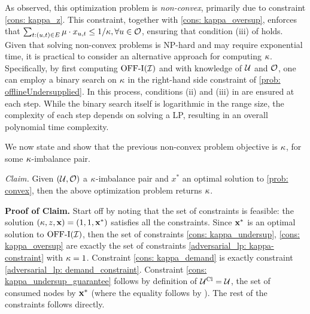 {As observed, this optimization problem is \textit{non-convex}, primarily due to constraint \eqref{cons: kappa_z}. This constraint, together with \eqref{cons: kappa_oversup}, enforces that $\sum_{t : (u,t) \in E} \mu \cdot x_{u,t} \leq 1/\kappa, \forall u \in \mathcal O$, ensuring that condition (iii) of  holds. Given that solving non-convex problems is NP-hard and may require exponential time, it is practical to consider an alternative approach for computing $\kappa$. Specifically, by first computing $\mathrm{\mathrm{OFF}}\textrm{-}\mathrm{I}(\mathcal I)$ and with knowledge of $\mathcal U$ and $\mathcal O$, one can employ a binary search on $\kappa$ in the right-hand side constraint of \ref{prob: offlineUndersupplied}. In this process, conditions (ii) and (iii) in  are ensured at each step. While the binary search itself is logarithmic in the range size, the complexity of each step depends on solving a LP, resulting in an overall polynomial time complexity.

We now state and show that the previous non-convex problem objective is $\kappa$, for some $\kappa$-imbalance pair.


\noindent\textit{Claim.}
    Given $(\mathcal U, \mathcal O)$ a $\kappa$-imbalance pair and $x^*$ an optimal solution to \ref{prob: convex}, then the above optimization problem returns $\kappa$.

\noindent \textbf{Proof of Claim.} Start off by noting that the set of constraints is feasible: the solution $(\kappa, z, \mathbf{x}) = (1,1,\mathbf{x}^*)$ satisfies all the constraints. Since $\mathbf{x}^*$ is an optimal solution to $\mathrm{\mathrm{OFF}}\textrm{-}\mathrm{I}(\mathcal I)$, then the set of constraints \eqref{cons: kappa_undersup}, \eqref{cons: kappa_oversup} are exactly the set of constraints \eqref{adversarial_lp: kappa-constraint} with $\kappa = 1$. Constraint \eqref{cons: kappa_demand} is exactly constraint \eqref{adversarial_lp: demand_constraint}. Constraint \eqref{cons: kappa_undersup_guarantee} follows by definition of $\mathcal U^{\mathrm{Cl}} = \mathcal U$, the set of consumed nodes by $\mathbf{x}^*$ (where the equality follows by ). The rest of the constraints follows directly.

}
